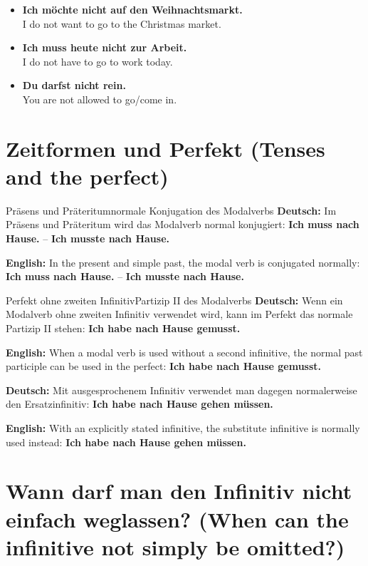 \documentclass[a4paper,11pt]{article}
\newcommand{\GermanText}[1]{\textbf{Deutsch: }#1\par}
\newcommand{\EnglishText}[1]{{\small\color{SoftGray}\textbf{English: }#1\par}}
\newcommand{\ExampleItem}[2]{\item \textbf{#1}\\{\small\color{SoftGray}#2}}
\begin{document}
        \begin{exbox}
            \begin{itemize}
                \ExampleItem{Ich möchte nicht auf den Weihnachtsmarkt.}{I do not want to go to the Christmas market.}
                \ExampleItem{Ich muss heute nicht zur Arbeit.}{I do not have to go to work today.}
                \ExampleItem{Du darfst nicht rein.}{You are not allowed to go/come in.}
            \end{itemize}
        \end{exbox}

    \section{Zeitformen und Perfekt \textnormal{(Tenses and the perfect)}}

        \begin{grammarentry}{Präsens und Präteritum}{normale Konjugation des Modalverbs}
            \GermanText{Im Präsens und Präteritum wird das Modalverb normal konjugiert: \textbf{Ich muss nach Hause.} -- \textbf{Ich musste nach Hause.}}
            \EnglishText{In the present and simple past, the modal verb is conjugated normally: \textbf{Ich muss nach Hause.} -- \textbf{Ich musste nach Hause.}}
        \end{grammarentry}

        \begin{grammarentry}{Perfekt ohne zweiten Infinitiv}{Partizip II des Modalverbs}
            \GermanText{Wenn ein Modalverb ohne zweiten Infinitiv verwendet wird, kann im Perfekt das normale Partizip II stehen: \textbf{Ich habe nach Hause gemusst.}}
            \EnglishText{When a modal verb is used without a second infinitive, the normal past participle can be used in the perfect: \textbf{Ich habe nach Hause gemusst.}}

            \GermanText{Mit ausgesprochenem Infinitiv verwendet man dagegen normalerweise den Ersatzinfinitiv: \textbf{Ich habe nach Hause gehen müssen.}}
            \EnglishText{With an explicitly stated infinitive, the substitute infinitive is normally used instead: \textbf{Ich habe nach Hause gehen müssen.}}
        \end{grammarentry}

    \section{Wann darf man den Infinitiv nicht einfach weglassen? \textnormal{(When can the infinitive not simply be omitted?)}}
\end{document}
